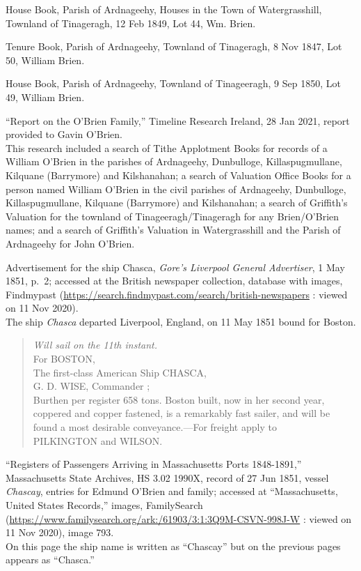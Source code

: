 \begin{thebibliography}{999}
House Book, Parish of Ardnageehy, Houses in the Town of Watergrasshill, Townland of Tinageragh, 12 Feb 1849, Lot 44, Wm. Brien.

Tenure Book, Parish of Ardnageehy, Townland of Tinageragh, 8 Nov 1847, Lot 50, William Brien.

House Book, Parish of Ardnageehy, Townland of Tinageeragh, 9 Sep 1850, Lot 49, William Brien.

``Report on the O'Brien Family,'' Timeline Research Ireland, 28 Jan 2021, report provided to Gavin O'Brien.\\
This research included a search of Tithe Applotment Books for records of a William O'Brien in the parishes of Ardnageehy, Dunbulloge, Killaspugmullane, Kilquane (Barrymore) and Kilshanahan; a search of Valuation Office Books for a person named William O'Brien in the civil parishes of Ardnageehy, Dunbulloge, Killaspugmullane, Kilquane (Barrymore) and Kilshanahan; a search of Griffith's Valuation for the townland of Tinageeragh/Tinageragh for any Brien/O'Brien names; and a search of Griffith's Valuation in Watergrasshill and the Parish of Ardnageehy for John O'Brien.

Advertisement for the ship Chasca, \textit{Gore's Liverpool General Advertiser}, 1 May 1851, p.\ 2; accessed at the British newspaper collection, database with images, Findmypast (\url{https://search.findmypast.com/search/british-newspapers} : viewed on 11 Nov 2020).\\
The ship \textit{Chasca} departed Liverpool, England, on 11 May 1851 bound for Boston. 
\begin{quote}
	\textit{Will sail on the 11th instant.}\\
	For BOSTON,\\
	The first-class American Ship CHASCA,\\
	G. D. WISE, Commander ;\\
	Burthen per register 658 tons. Boston built, now in her second year, coppered and copper fastened, is a remarkably fast sailer, and will be found a most desirable conveyance.---For freight apply to\\
	PILKINGTON and WILSON.
\end{quote}

``Registers of Passengers Arriving in Massachusetts Ports 1848-1891,'' Massachusetts State Archives, HS 3.02 1990X, record of 27 Jun 1851, vessel \textit{Chascay}, entries for Edmund O'Brien and family; accessed at ``Massachusetts, United States Records,'' images, FamilySearch (\url{https://www.familysearch.org/ark:/61903/3:1:3Q9M-CSVN-998J-W} : viewed on 11 Nov 2020), image 793.\\
On this page the ship name is written as ``Chascay'' but on the previous pages appears as ``Chasca.''


\end{thebibliography}
